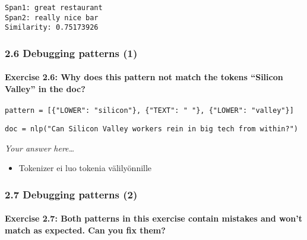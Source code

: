 \documentclass[11pt]{article}
\providecommand{\tightlist}{%
      \setlength{\itemsep}{0pt}\setlength{\parskip}{0pt}}
\begin{document}
    \begin{Verbatim}[commandchars=\\\{\}]
Span1: great restaurant
Span2: really nice bar
Similarity: 0.75173926

    \end{Verbatim}

    \hypertarget{debugging-patterns-1}{%
\subsubsection{2.6 Debugging patterns (1)}\label{debugging-patterns-1}}

\hypertarget{exercise-2.6-why-does-this-pattern-not-match-the-tokens-silicon-valley-in-the-doc}{%
\paragraph{Exercise 2.6: Why does this pattern not match the tokens
``Silicon Valley'' in the
doc?}\label{exercise-2.6-why-does-this-pattern-not-match-the-tokens-silicon-valley-in-the-doc}}

\texttt{pattern\ =\ {[}\{"LOWER":\ "silicon"\},\ \{"TEXT":\ "\ "\},\ \{"LOWER":\ "valley"\}{]}}

\texttt{doc\ =\ nlp("Can\ Silicon\ Valley\ workers\ rein\ in\ big\ tech\ from\ within?")}

    \emph{Your answer here\ldots{}}

    \begin{itemize}
\tightlist
\item
  Tokenizer ei luo tokenia välilyönnille
\end{itemize}

    \hypertarget{debugging-patterns-2}{%
\subsubsection{2.7 Debugging patterns (2)}\label{debugging-patterns-2}}

\hypertarget{exercise-2.7-both-patterns-in-this-exercise-contain-mistakes-and-wont-match-as-expected.-can-you-fix-them}{%
\paragraph{Exercise 2.7: Both patterns in this exercise contain mistakes
and won't match as expected. Can you fix
them?}\label{exercise-2.7-both-patterns-in-this-exercise-contain-mistakes-and-wont-match-as-expected.-can-you-fix-them}}
\end{document}
